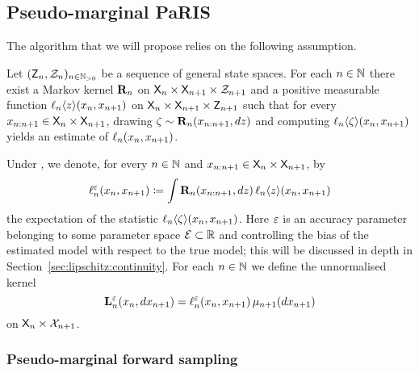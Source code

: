 \subsection{Pseudo-marginal PaRIS}

The algorithm that we will propose relies on the following assumption. 
 
\begin{hypH}
\label{assum:biased:estimate}
Let $(\mathsf{Z}_n, \mathcal{Z}_n)_{n \in \mathbb{N}_{> 0}}$ be a sequence of general state spaces. For each $n \in \mathbb{N}$ there exist a Markov kernel $\mathbf{R}_{n}$ on $\mathsf{X}_n \times \mathsf{X}_{n + 1} \times \mathcal{Z}_{n + 1}$ and a positive measurable function $\ell_{n} \langle z \rangle(x_n, x_{n + 1})$ on $\mathsf{X}_n \times \mathsf{X}_{n + 1} \times \mathsf{Z}_{n + 1}$ such that for every $x_{n:n + 1} \in \mathsf{X}_n \times \mathsf{X}_{n + 1}$, drawing $\zeta \sim \mathbf{R}_{n}(x_{n:n + 1}, d z)$ and computing $\ell_{n} \langle \zeta \rangle(x_n, x_{n + 1})$ yields an estimate of $\ell_{n}(x_n, x_{n + 1})$.  
\end{hypH}


Under , we denote, for every $n \in \mathbb{N}$ and $x_{n:n + 1} \in \mathsf{X}_n \times \mathsf{X}_{n + 1}$, by   
\begin{equation} \label{eq:def:udmod}
\udmod{n}(x_n, x_{n + 1}) \eqdef \int \ukdist{n}(x_{n:n + 1}, \rmd z) \, \ukest{n}{z}(x_n, x_{n + 1})
\end{equation}
the expectation of the statistic $\ell_{n} \langle \zeta \rangle(x_n, x_{n + 1})$. Here $\varepsilon$ is an accuracy parameter belonging to some parameter space $\mathcal{E} \subset \mathbb{R}$ and controlling the bias of the estimated model with respect to the true model; this will be discussed in depth in Section~\ref{sec:lipschitz:continuity}. For each $n \in \mathbb{N}$ we define the unnormalised kernel 
\begin{equation} \label{eq:def:ukmod}
    \ukmod{n}(x_n, \rmd x_{n + 1}) = \udmod{n}(x_n, x_{n + 1}) \, \mu_{n + 1}(\rmd x_{n + 1}) 
\end{equation}
on $\mathsf{X}_n \times \mathcal{X}_{n + 1}$. 
 

\subsubsection{Pseudo-marginal forward sampling}
\label{eq:sec:pm:forward:sampling}

